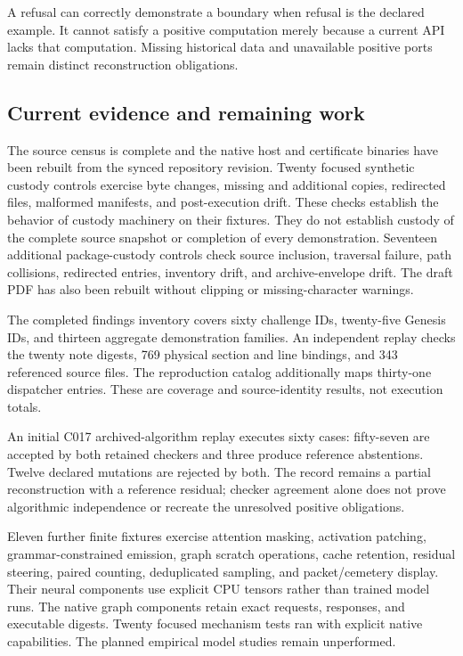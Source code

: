 \documentclass[
  11pt,
]{article}
\begin{document}
A refusal can correctly demonstrate a boundary when refusal is the
declared example. It cannot satisfy a positive computation merely
because a current API lacks that computation. Missing historical data
and unavailable positive ports remain distinct reconstruction
obligations.

\subsection{Current evidence and remaining
work}\label{current-evidence-and-remaining-work}

The source census is complete and the native host and certificate
binaries have been rebuilt from the synced repository revision. Twenty
focused synthetic custody controls exercise byte changes, missing and
additional copies, redirected files, malformed manifests, and
post-execution drift. These checks establish the behavior of custody
machinery on their fixtures. They do not establish custody of the
complete source snapshot or completion of every demonstration. Seventeen
additional package-custody controls check source inclusion, traversal
failure, path collisions, redirected entries, inventory drift, and
archive-envelope drift. The draft PDF has also been rebuilt without
clipping or missing-character warnings.

The completed findings inventory covers sixty challenge IDs, twenty-five
Genesis IDs, and thirteen aggregate demonstration families. An
independent replay checks the twenty note digests, 769 physical section
and line bindings, and 343 referenced source files. The reproduction
catalog additionally maps thirty-one dispatcher entries. These are
coverage and source-identity results, not execution totals.

An initial C017 archived-algorithm replay executes sixty cases:
fifty-seven are accepted by both retained checkers and three produce
reference abstentions. Twelve declared mutations are rejected by both.
The record remains a partial reconstruction with a reference residual;
checker agreement alone does not prove algorithmic independence or
recreate the unresolved positive obligations.

Eleven further finite fixtures exercise attention masking, activation
patching, grammar-constrained emission, graph scratch operations, cache
retention, residual steering, paired counting, deduplicated sampling,
and packet/cemetery display. Their neural components use explicit CPU
tensors rather than trained model runs. The native graph components
retain exact requests, responses, and executable digests. Twenty focused
mechanism tests ran with explicit native capabilities. The planned
empirical model studies remain unperformed.
\end{document}
